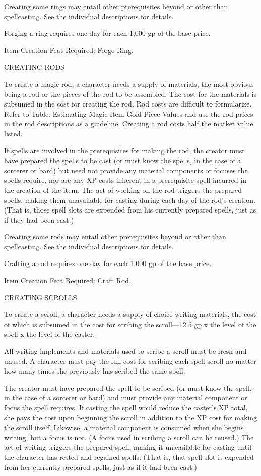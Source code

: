 \documentclass{article}
\begin{document}
Creating some rings may entail other prerequisites beyond or other than spellcasting. 
See the individual descriptions for details.

Forging a ring requires one day for each 1,000 gp of the base price.

Item Creation Feat Required: Forge Ring.

\vspace{12pt}
{\large{}CREATING RODS}

To create a magic rod, a character needs a supply of materials, the most obvious 
being a rod or the pieces of the rod to be assembled. The cost for the materials 
is subsumed in the cost for creating the rod. Rod costs are difficult to formularize. 
Refer to Table: Estimating Magic Item Gold Piece Values and use the rod prices 
in the rod descriptions as a guideline. Creating a rod costs half the market value 
listed.

If spells are involved in the prerequisites for making the rod, the creator must 
have prepared the spells to be cast (or must know the spells, in the case of a 
sorcerer or bard) but need not provide any material components or focuses the spells 
require, nor are any XP costs inherent in a prerequisite spell incurred in the 
creation of the item. The act of working on the rod triggers the prepared spells, 
making them unavailable for casting during each day of the rod's creation. (That 
is, those spell slots are expended from his currently prepared spells, just as 
if they had been cast.)

Creating some rods may entail other prerequisites beyond or other than spellcasting. 
See the individual descriptions for details.

Crafting a rod requires one day for each 1,000 gp of the base price.

Item Creation Feat Required: Craft Rod.

\vspace{12pt}
{\large{}CREATING SCROLLS}

To create a scroll, a character needs a supply of choice writing materials, the 
cost of which is subsumed in the cost for scribing the scroll---12.5 gp x the level 
of the spell x the level of the caster.

All writing implements and materials used to scribe a scroll must be fresh and 
unused. A character must pay the full cost for scribing each spell scroll no matter 
how many times she previously has scribed the same spell.

The creator must have prepared the spell to be scribed (or must know the spell, 
in the case of a sorcerer or bard) and must provide any material component or focus 
the spell requires. If casting the spell would reduce the caster's XP total, she 
pays the cost upon beginning the scroll in addition to the XP cost for making the 
scroll itself. Likewise, a material component is consumed when she begins writing, 
but a focus is not. (A focus used in scribing a scroll can be reused.) The act 
of writing triggers the prepared spell, making it unavailable for casting until 
the character has rested and regained spells. (That is, that spell slot is expended 
from her currently prepared spells, just as if it had been cast.)
\end{document}
